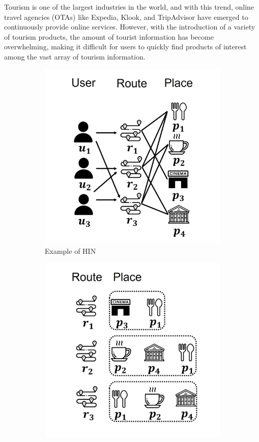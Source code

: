 \documentclass[]{article}
\begin{document}
Tourism is one of the largest industries in the world, and with this trend, online travel agencies (OTAs) like Expedia, Klook, and TripAdvisor have emerged to continuously provide online services. However, with the introduction of a variety of tourism products, the amount of tourist information has become overwhelming, making it difficult for users to quickly find products of interest among the vast array of tourism information.
\begin{figure}[!htbp]
	\centering
	\begin{subfigure}[b]{0.45\textwidth}
		\centering
		\includegraphics[width=\textwidth]{fig/그림1.jpg}
		\caption{Example of HIN}
		\label{fig1:image1}
	\end{subfigure}
	\hfill
	\begin{subfigure}[b]{0.45\textwidth}
		\centering
		\includegraphics[width=\textwidth]{fig/그림2.jpg}

\end{subfigure}
\end{figure}
\end{document}

